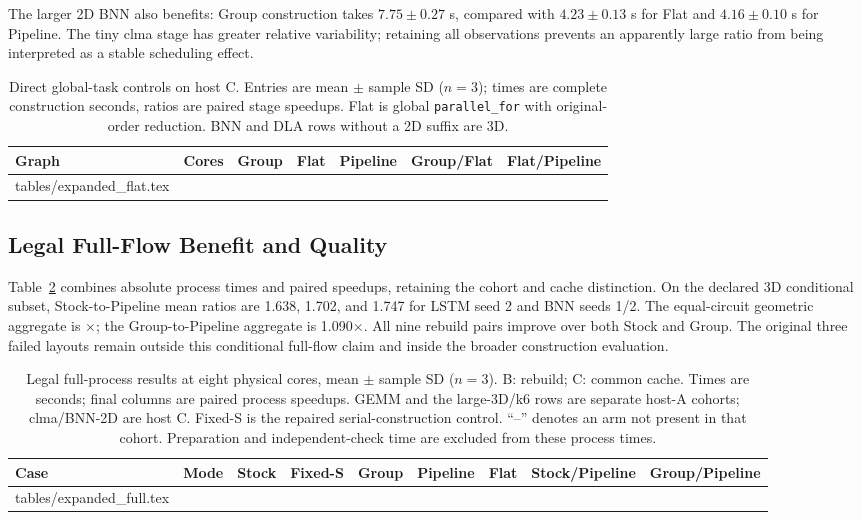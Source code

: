 \documentclass[conference,10pt,letterpaper]{IEEEtran}
\makeatletter
\newcommand{\speedup}{\ensuremath{\times}}
\newcommand{\tableinput}[1]{\@@input #1 }
\makeatother
\begin{document}
The larger 2D BNN also benefits: Group construction takes $7.75\pm0.27$ s, compared with $4.23\pm0.13$ s for Flat and $4.16\pm0.10$ s for Pipeline. The tiny clma stage has greater relative variability; retaining all observations prevents an apparently large ratio from being interpreted as a stable scheduling effect.

\begin{table}[t]
\centering\footnotesize
\caption{Direct global-task controls on host C. Entries are mean $\pm$ sample SD ($n=3$); times are complete construction seconds, ratios are paired stage speedups. Flat is global \texttt{parallel\_for} with original-order reduction. BNN and DLA rows without a 2D suffix are 3D.}
\label{tab:flat}
\setlength{\tabcolsep}{5pt}
\begin{tabular}{lrrrrrr}
\toprule
Graph & Cores & Group & Flat & Pipeline & Group/Flat & Flat/Pipeline \\
\midrule
\tableinput{tables/expanded_flat.tex}
\bottomrule
\end{tabular}
\end{table}

\subsection{Legal Full-Flow Benefit and Quality}
Table~\ref{tab:full} combines absolute process times and paired speedups, retaining the cohort and cache distinction. On the declared 3D conditional subset, Stock-to-Pipeline mean ratios are 1.638, 1.702, and 1.747 for LSTM seed 2 and BNN seeds 1/2. The equal-circuit geometric aggregate is \LargeThreeDProcess\speedup; the Group-to-Pipeline aggregate is 1.090\speedup. All nine rebuild pairs improve over both Stock and Group. The original three failed layouts remain outside this conditional full-flow claim and inside the broader construction evaluation.

\begin{table}[t]
\centering\scriptsize
\caption{Legal full-process results at eight physical cores, mean $\pm$ sample SD ($n=3$). B: rebuild; C: common cache. Times are seconds; final columns are paired process speedups. GEMM and the large-3D/k6 rows are separate host-A cohorts; clma/BNN-2D are host C. Fixed-S is the repaired serial-construction control. ``--'' denotes an arm not present in that cohort. Preparation and independent-check time are excluded from these process times.}
\label{tab:full}
\setlength{\tabcolsep}{2.5pt}
\begin{tabular}{llrrrrrrr}
\toprule
Case & Mode & Stock & Fixed-S & Group & Pipeline & Flat & Stock/Pipeline & Group/Pipeline \\
\midrule
\tableinput{tables/expanded_full.tex}
\bottomrule
\end{tabular}
\end{table}
\end{document}
